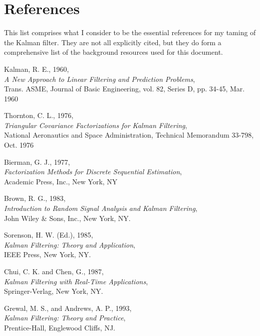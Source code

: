 \section{References}

This list comprises what I consider to be the essential references for my taming of
the Kalman filter. They are not all explicitly cited, but they do form a comprehensive
list of the background resources used for this document.

\renewcommand{\refname}{}
\vspace{-11mm}

\begin{thebibliography}{9}

Kalman, R. E., 1960, \\
\emph{A New Approach to Linear Filtering and Prediction Problems}, \\
Trans. ASME, Journal of Basic Engineering, vol. 82, Series D, pp. 34-45, Mar. 1960

Thornton, C. L., 1976, \\
\emph{Triangular Covariance Factorizations for Kalman Filtering}, \\
National Aeronautics and Space Administration, Technical Memorandum 33-798, Oct. 1976

Bierman, G. J., 1977, \\
\emph{Factorization Methods for Discrete Sequential Estimation}, \\
Academic Press, Inc., New York, NY

Brown, R. G., 1983, \\
\emph{Introduction to Random Signal Analysis and Kalman Filtering}, \\
John Wiley \& Sons, Inc., New York, NY.

Sorenson, H. W. (Ed.), 1985, \\
\emph{Kalman Filtering: Theory and Application}, \\
IEEE Press, New York, NY.

Chui, C. K. and Chen, G., 1987, \\
\emph{Kalman Filtering with Real-Time Applications}, \\
Springer-Verlag, New York, NY.

Grewal, M. S., and Andrews, A. P., 1993, \\
\emph{Kalman Filtering: Theory and Practice}, \\
Prentice-Hall, Englewood Cliffs, NJ.


\end{thebibliography}
